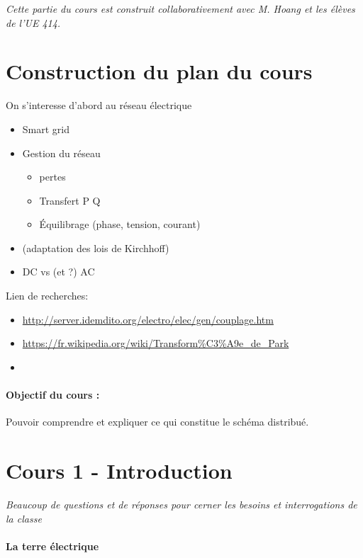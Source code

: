 \documentclass[main.tex]{subfiles}
\begin{document}
\emph{Cette partie du cours est construit collaborativement avec M. Hoang et les élèves de l'UE 414.}


\section*{Construction du plan du cours}
On s'interesse d'abord au réseau électrique
\begin{itemize}
\item Smart grid
\item Gestion du  réseau
  \begin{itemize}
  \item pertes
  \item Transfert P Q
  \item Équilibrage (phase, tension, courant)
  \end{itemize}
\item (adaptation des lois de Kirchhoff)
\item DC vs (et ?) AC
\end{itemize}
Lien de recherches:
\begin{itemize}
\item \url{http://server.idemdito.org/electro/elec/gen/couplage.htm}
\item \url{https://fr.wikipedia.org/wiki/Transform\%C3\%A9e_de_Park}
\item \url{}
\end{itemize}
\paragraph{Objectif du cours :} Pouvoir comprendre et expliquer ce qui constitue le schéma distribué.

\section{Cours 1 - Introduction}
\emph{Beaucoup de questions et de réponses pour cerner les besoins et interrogations de la classe}

\paragraph{La terre  électrique} 


\end{document}
